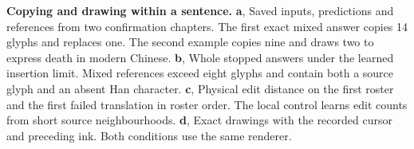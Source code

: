 \textbf{Copying and drawing within a sentence.}
\textbf{a}, Saved inputs, predictions and references from two confirmation chapters. The first exact mixed answer copies 14 glyphs and replaces one. The second example copies nine and draws two to express death in modern Chinese.
\textbf{b}, Whole stopped answers under the learned insertion limit. Mixed references exceed eight glyphs and contain both a source glyph and an absent Han character.
\textbf{c}, Physical edit distance on the first roster and the first failed translation in roster order. The local control learns edit counts from short source neighbourhoods.
\textbf{d}, Exact drawings with the recorded cursor and preceding ink. Both conditions use the same renderer.
